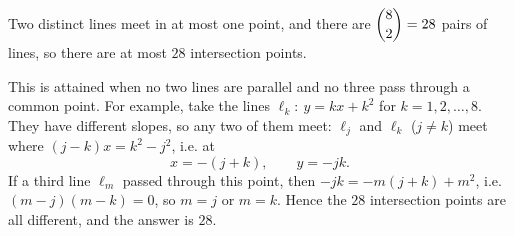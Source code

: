 Two distinct lines meet in at most one point, and there are $\dbinom82=28$ pairs of lines, so there are at most $28$ intersection points.

This is attained when no two lines are parallel and no three pass through a common point. For example, take the lines $\ell_k:\ y=kx+k^2$ for $k=1,2,\dots,8$. They have different slopes, so any two of them meet: $\ell_j$ and $\ell_k$ ($j\ne k$) meet where $(j-k)x=k^2-j^2$, i.e. at
\[x=-(j+k),\qquad y=-jk.\]
If a third line $\ell_m$ passed through this point, then $-jk=-m(j+k)+m^2$, i.e. $(m-j)(m-k)=0$, so $m=j$ or $m=k$. Hence the $28$ intersection points are all different, and the answer is $\boxed{28}$.
